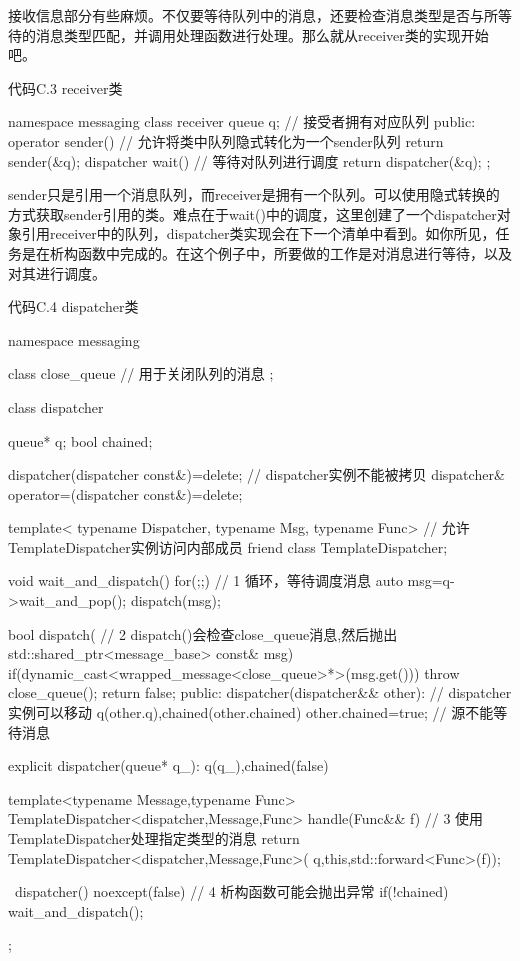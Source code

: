 接收信息部分有些麻烦。不仅要等待队列中的消息，还要检查消息类型是否与所等待的消息类型匹配，并调用处理函数进行处理。那么就从receiver类的实现开始吧。

代码C.3 receiver类

\begin{cpp}
namespace messaging
{
  class receiver
  {
    queue q;  // 接受者拥有对应队列
  public:
    operator sender()  // 允许将类中队列隐式转化为一个sender队列
    {
      return sender(&q);
    }
    dispatcher wait()  // 等待对队列进行调度
    {
      return dispatcher(&q);
    }
  };
}
\end{cpp}

sender只是引用一个消息队列，而receiver是拥有一个队列。可以使用隐式转换的方式获取sender引用的类。难点在于wait()中的调度，这里创建了一个dispatcher对象引用receiver中的队列，dispatcher类实现会在下一个清单中看到。如你所见，任务是在析构函数中完成的。在这个例子中，所要做的工作是对消息进行等待，以及对其进行调度。

代码C.4 dispatcher类

\begin{cpp}
namespace messaging
{
  class close_queue  // 用于关闭队列的消息
  {};

  class dispatcher
  {
    queue* q;
    bool chained;

    dispatcher(dispatcher const&)=delete;  // dispatcher实例不能被拷贝
    dispatcher& operator=(dispatcher const&)=delete;

    template<
      typename Dispatcher,
      typename Msg,
      typename Func>  // 允许TemplateDispatcher实例访问内部成员
    friend class TemplateDispatcher;

    void wait_and_dispatch()
    {
      for(;;)  // 1 循环，等待调度消息
      {
        auto msg=q->wait_and_pop();
        dispatch(msg);
      }
    }

    bool dispatch(  // 2 dispatch()会检查close_queue消息,然后抛出
      std::shared_ptr<message_base> const& msg)
    {
      if(dynamic_cast<wrapped_message<close_queue>*>(msg.get()))
      {
        throw close_queue();
      }
      return false;
    }
  public:
    dispatcher(dispatcher&& other):  // dispatcher实例可以移动
      q(other.q),chained(other.chained)
    {
      other.chained=true;  // 源不能等待消息
    }

    explicit dispatcher(queue* q_):
      q(q_),chained(false)
    {}

    template<typename Message,typename Func>
    TemplateDispatcher<dispatcher,Message,Func>
    handle(Func&& f)  // 3 使用TemplateDispatcher处理指定类型的消息
    {
      return TemplateDispatcher<dispatcher,Message,Func>(
        q,this,std::forward<Func>(f));
    }

    ~dispatcher() noexcept(false)  // 4 析构函数可能会抛出异常
    {
      if(!chained)
      {
        wait_and_dispatch();
      }
    }
  };
}
\end{cpp}

